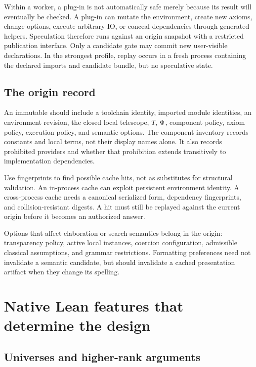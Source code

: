 Within a worker, a plug-in is not automatically safe merely because its result will eventually be checked. A plug-in can mutate the environment, create new axioms, change options, execute arbitrary IO, or conceal dependencies through generated helpers. Speculation therefore runs against an origin snapshot with a restricted publication interface. Only a candidate gate may commit new user-visible declarations. In the strongest profile, replay occurs in a fresh process containing the declared imports and candidate bundle, but no speculative state.

\subsection{The origin record}

An immutable  should include a toolchain identity, imported module identities, an environment revision, the closed local telescope, $T$, $\Phi$, component policy, axiom policy, execution policy, and semantic options. The component inventory records constants and local terms, not their display names alone. It also records prohibited providers and whether that prohibition extends transitively to implementation dependencies.

Use fingerprints to find possible cache hits, not as substitutes for structural validation. An in-process cache can exploit persistent environment identity. A cross-process cache needs a canonical serialized form, dependency fingerprints, and collision-resistant digests. A hit must still be replayed against the current origin before it becomes an authorized answer.

Options that affect elaboration or search semantics belong in the origin: transparency policy, active local instances, coercion configuration, admissible classical assumptions, and grammar restrictions. Formatting preferences need not invalidate a semantic candidate, but should invalidate a cached presentation artifact when they change its spelling.

\section{Native Lean features that determine the design}
\label{sec:nativefeatures}

\subsection{Universes and higher-rank arguments}


